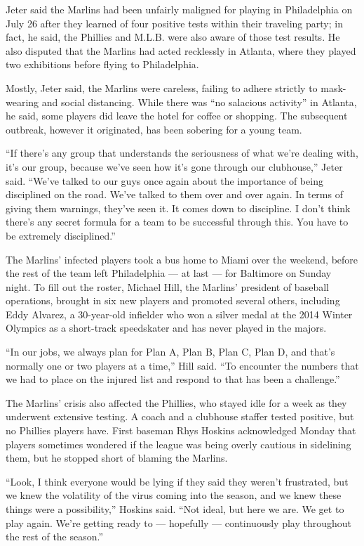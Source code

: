 Jeter said the Marlins had been unfairly maligned for playing in
Philadelphia on July 26 after they learned of four positive tests within
their traveling party; in fact, he said, the Phillies and M.L.B. were
also aware of those test results. He also disputed that the Marlins had
acted recklessly in Atlanta, where they played two exhibitions before
flying to Philadelphia.

Mostly, Jeter said, the Marlins were careless, failing to adhere
strictly to mask-wearing and social distancing. While there was ``no
salacious activity'' in Atlanta, he said, some players did leave the
hotel for coffee or shopping. The subsequent outbreak, however it
originated, has been sobering for a young team.

``If there's any group that understands the seriousness of what we're
dealing with, it's our group, because we've seen how it's gone through
our clubhouse,'' Jeter said. ``We've talked to our guys once again about
the importance of being disciplined on the road. We've talked to them
over and over again. In terms of giving them warnings, they've seen it.
It comes down to discipline. I don't think there's any secret formula
for a team to be successful through this. You have to be extremely
disciplined.''

The Marlins' infected players took a bus home to Miami over the weekend,
before the rest of the team left Philadelphia --- at last --- for
Baltimore on Sunday night. To fill out the roster, Michael Hill, the
Marlins' president of baseball operations, brought in six new players
and promoted several others, including Eddy Alvarez, a 30-year-old
infielder who won a silver medal at the 2014 Winter Olympics as a
short-track speedskater and has never played in the majors.

``In our jobs, we always plan for Plan A, Plan B, Plan C, Plan D, and
that's normally one or two players at a time,'' Hill said. ``To
encounter the numbers that we had to place on the injured list and
respond to that has been a challenge.''

The Marlins' crisis also affected the Phillies, who stayed idle for a
week as they underwent extensive testing. A coach and a clubhouse
staffer tested positive, but no Phillies players have. First baseman
Rhys Hoskins acknowledged Monday that players sometimes wondered if the
league was being overly cautious in sidelining them, but he stopped
short of blaming the Marlins.

``Look, I think everyone would be lying if they said they weren't
frustrated, but we knew the volatility of the virus coming into the
season, and we knew these things were a possibility,'' Hoskins said.
``Not ideal, but here we are. We get to play again. We're getting ready
to --- hopefully --- continuously play throughout the rest of the
season.''

